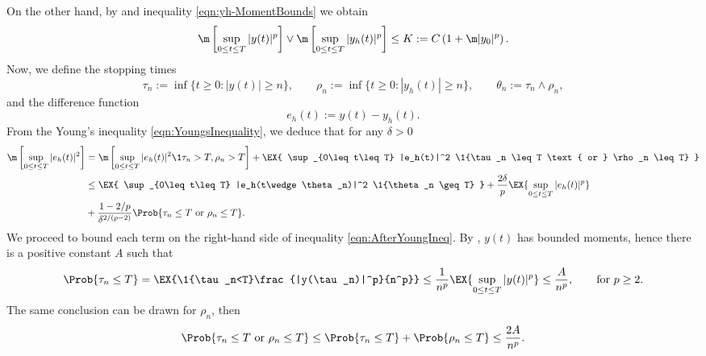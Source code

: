 \begin{pf}
		On the other hand, by  and inequality \eqref{eqn:yh-MomentBounds} we obtain
	\begin{equation*}
		\m\left[
			\sup_{0\leq t \leq T}
				|y(t)|^p
		\right]
		\vee
		\m\left[
			\sup_{0\leq t \leq T}
				|y_h(t)|^p
		\right]
		\leq
		K := C
		\left( 
			1+\m |y_0|^p
		\right).
	\end{equation*}
	Now, we define the stopping times
	\begin{equation}\label{eqn:StoppingTimes}
		\tau_n := 
			\inf\{
				t\geq 0: |y(t)|\geq n
			\},
		\qquad
		\rho_n := 
			\inf\{
				t\geq 0: |y_h(t)|\geq n
			\},
		\qquad
		\theta_n:=
			\tau_n \wedge \rho_n,
	\end{equation}
	and the difference function
	\begin{equation*}
		e_h(t):= y(t) - y_h(t).
	\end{equation*}
	From the Young's inequality \eqref{eqn:YoungsInequality}, we deduce that for any $\delta>0$ 
	\begin{align}
		\m\left[
			\sup_{0\leq t\leq T}
			|e_h(t)|^2
		\right]
		&=
			\m\left[
				\sup_{0\leq t\leq T}
				|e_h(t)|^2
				\1{\tau_n>T,\rho_n>T}
			\right]
			+
			\EX{
				\sup_{0\leq t\leq T}
				|e_h(t)|^2
				\1{\tau_n \leq T \text{ or } \rho_n \leq T}
			}\notag\\
		&\leq
			\EX{
				\sup_{0\leq t\leq T}
				|e_h(t\wedge \theta_n)|^2
				\1{\theta_n \geq T}
			}
			+\frac{2\delta}{p}
			\EX{
				\sup_{0\leq t\leq T}
				|e_h(t)|^p 
			}\notag \\
		&+
			\frac{1-2/p}{\delta^{2/(p-2)}}
			\Prob{\tau_n \leq T \text{ or } \rho_n \leq T}.
	\label{eqn:AfterYoungIneq}
	\end{align}
	We proceed to bound each term on the right-hand side of inequality \eqref{eqn:AfterYoungIneq}.
	By , $y(t)$ has bounded moments, hence 
	there is a positive constant $A$ such that
	\begin{equation}\label{eqn:BoundProbTauR}
		\Prob{\tau_n\leq T}
		=
			\EX{\1{\tau_n<T}\frac{|y(\tau_n)|^p}{n^p}}
		\leq
			\frac{1}{n^p}\EX{\sup_{0\leq t\leq T}|y(t)|^p} \leq \frac{A}{n^p},
			\qquad \text{for } p\geq 2.
	\end{equation}
	The same conclusion can be drawn for $\rho_n$, then
	\begin{equation} \label{eqn:BoundProbTauRorRhoR}
		\Prob{\tau_n \leq T \text{ or } \rho_n \leq T}
		\leq
			\Prob{\tau_n\leq T}+\Prob{\rho_n\leq T}
		\leq
		\frac{2A}{n^p}.
	\end{equation}

\end{pf}
